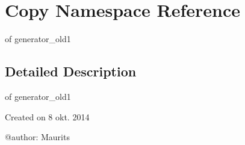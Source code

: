 \hypertarget{namespace_copy}{}\section{Copy Namespace Reference}
\label{namespace_copy}


of generator\+\_\+old1  




\subsection{Detailed Description}
of generator\+\_\+old1 

\begin{DoxyVerb}Created on 8 okt. 2014

@author: Maurits
\end{DoxyVerb}
 